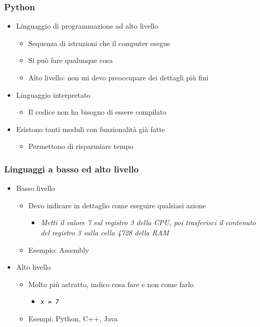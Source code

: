 \begin{contentframe}
    \frametitle{Python}

    \begin{itemize}
        \item Linguaggio di programmazione ad alto livello
        \begin{itemize}
            \item Sequenza di istruzioni che il computer esegue
            \item Si può fare qualunque cosa
            \item Alto livello: non mi devo preoccupare dei dettagli più fini
        \end{itemize}
        
        \bigskip
        \item Linguaggio interpretato
        \begin{itemize}
            \item Il codice non ha bisogno di essere compilato
        \end{itemize}

        \bigskip
        \item Esistono tanti moduli con funzionalità già fatte
        \begin{itemize}
            \item Permettono di risparmiare tempo
        \end{itemize}
    \end{itemize}
\end{contentframe}

\begin{exampleframe}
    \frametitle{Linguaggi a basso ed alto livello}

    \begin{itemize}
        \item Basso livello
        \begin{itemize}
            \item Devo indicare in dettaglio come eseguire qualsiasi azione
            \begin{itemize}
                \item \textit{Metti il valore 7 sul registro 3 della CPU, poi trasferisci il contenuto del registro 3 sulla cella 4728 della RAM} 
            \end{itemize}
            \item Esempio: Assembly
        \end{itemize}

        \bigskip
        \item Alto livello
        \begin{itemize}
            \item Molto più astratto, indico cosa fare e non come farlo
            \begin{itemize}
                \item \textit{\texttt{x = 7}}
            \end{itemize}
            \item Esempi: Python, C++, Java
        \end{itemize}
    \end{itemize}
\end{exampleframe}

